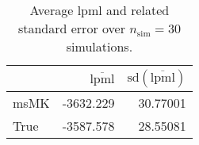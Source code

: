 \begin{table}[H]

\caption{Average lpml and related standard error over $n_{\text{sim}} = 30$ simulations.}
\centering
\begin{tabular}[t]{lrr}
\toprule
  & $\overbar{\text{lpml}}$ & $\text{sd}(\overbar{\text{lpml}})$\\
\midrule
msMK & -3632.229 & 30.77001\\
True & -3587.578 & 28.55081\\
\bottomrule
\end{tabular}
\end{table}